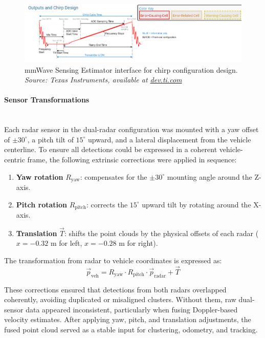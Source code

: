 \begin{figure}[!htbp]
    \centering
    \includegraphics[width=0.9\linewidth]{images/sensingEstimatorChirp.png}
    \caption{mmWave Sensing Estimator interface for chirp configuration design.\\
    \textit{Source: Texas Instruments, available at \href{https://dev.ti.com/gallery/view/mmwave/mmWaveSensingEstimator/ver/2.5.1/}{dev.ti.com}}}
    \label{fig:mmwave_sensing_estimator}
\end{figure}
\vspace{0.5em}
\paragraph{Sensor Transformations}
\hfill
\\
Each radar sensor in the dual-radar configuration was mounted with a yaw offset of $\pm30^\circ$, a pitch tilt of $15^\circ$ upward, and a lateral displacement from the vehicle centerline.  
To ensure all detections could be expressed in a coherent vehicle-centric frame, the following extrinsic corrections were applied in sequence:

\begin{enumerate}
    \item \textbf{Yaw rotation} $R_{\text{yaw}}$: compensates for the $\pm30^\circ$ mounting angle around the Z-axis.  
    \item \textbf{Pitch rotation} $R_{\text{pitch}}$: corrects the $15^\circ$ upward tilt by rotating around the X-axis.  
    \item \textbf{Translation} $\vec{T}$: shifts the point clouds by the physical offsets of each radar ($x=-0.32$ m for left, $x=-0.28$ m for right).
\end{enumerate}

The transformation from radar to vehicle coordinates is expressed as:
\begin{equation}
    \vec{p}_{\text{veh}} = R_{\text{yaw}} \cdot R_{\text{pitch}} \cdot \vec{p}_{\text{radar}} + \vec{T}
    \label{eq:radar_to_vehicle_transform_short}
\end{equation}

These corrections ensured that detections from both radars overlapped coherently, avoiding duplicated or misaligned clusters.  
Without them, raw dual-sensor data appeared inconsistent, particularly when fusing Doppler-based velocity estimates.  
After applying yaw, pitch, and translation adjustments, the fused point cloud served as a stable input for clustering, odometry, and tracking.
\vspace{0.5em}
